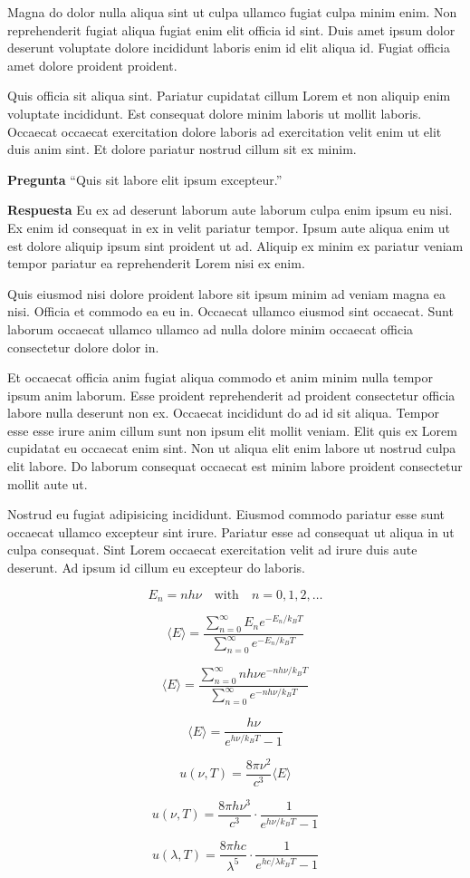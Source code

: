 Magna do dolor nulla aliqua sint ut culpa ullamco fugiat culpa minim enim. Non reprehenderit fugiat aliqua fugiat enim elit officia id sint. Duis amet ipsum dolor deserunt voluptate dolore incididunt laboris enim id elit aliqua id. Fugiat officia amet dolore proident proident.

Quis officia sit aliqua sint. Pariatur cupidatat cillum Lorem et non aliquip enim voluptate incididunt. Est consequat dolore minim laboris ut mollit laboris. Occaecat occaecat exercitation dolore laboris ad exercitation velit enim ut elit duis anim sint. Et dolore pariatur nostrud cillum sit ex minim.


\noindent \textbf{Pregunta}
``Quis sit labore elit ipsum excepteur.''

\noindent \textbf{Respuesta}
Eu ex ad deserunt laborum aute laborum culpa enim ipsum eu nisi. Ex enim id consequat in ex in velit pariatur tempor. Ipsum aute aliqua enim ut est dolore aliquip ipsum sint proident ut ad. Aliquip ex minim ex pariatur veniam tempor pariatur ea reprehenderit Lorem nisi ex enim.

Quis eiusmod nisi dolore proident labore sit ipsum minim ad veniam magna ea nisi. Officia et commodo ea eu in. Occaecat ullamco eiusmod sint occaecat. Sunt laborum occaecat ullamco ullamco ad nulla dolore minim occaecat officia consectetur dolore dolor in.

Et occaecat officia anim fugiat aliqua commodo et anim minim nulla tempor ipsum anim laborum. Esse proident reprehenderit ad proident consectetur officia labore nulla deserunt non ex. Occaecat incididunt do ad id sit aliqua. Tempor esse esse irure anim cillum sunt non ipsum elit mollit veniam. Elit quis ex Lorem cupidatat eu occaecat enim sint. Non ut aliqua elit enim labore ut nostrud culpa elit labore. Do laborum consequat occaecat est minim labore proident consectetur mollit aute ut.

Nostrud eu fugiat adipisicing incididunt. Eiusmod commodo pariatur esse sunt occaecat ullamco excepteur sint irure. Pariatur esse ad consequat ut aliqua in ut culpa consequat. Sint Lorem occaecat exercitation velit ad irure duis aute deserunt. Ad ipsum id cillum eu excepteur do laboris.


\[
E_n = n h \nu \quad \text{with} \quad n = 0, 1, 2, \dots
\]

\[
\langle E \rangle = \frac{\sum_{n=0}^{\infty} E_n e^{-E_n / k_B T}}{\sum_{n=0}^{\infty} e^{-E_n / k_B T}}
\]

\[
\langle E \rangle = \frac{\sum_{n=0}^{\infty} n h \nu e^{-n h \nu / k_B T}}{\sum_{n=0}^{\infty} e^{-n h \nu / k_B T}}
\]

\[
\langle E \rangle = \frac{h \nu}{e^{h \nu / k_B T} - 1}
\]

\[
u(\nu, T) = \frac{8 \pi \nu^2}{c^3} \langle E \rangle
\]

\[
u(\nu, T) = \frac{8 \pi h \nu^3}{c^3} \cdot \frac{1}{e^{h \nu / k_B T} - 1}
\]

\[
u(\lambda, T) = \frac{8 \pi h c}{\lambda^5} \cdot \frac{1}{e^{h c / \lambda k_B T} - 1}
\]

